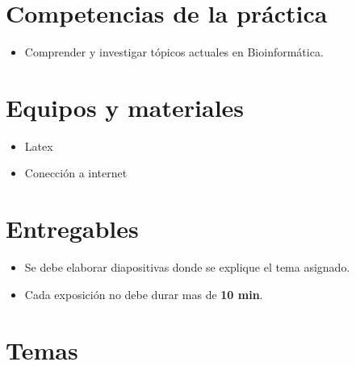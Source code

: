 \documentclass{article}
\begin{document}
	
	\section{Competencias de la práctica}
	\begin{itemize}
		\item Comprender y investigar tópicos actuales en Bioinformática.
	\end{itemize}
	
	\section{Equipos y materiales}
	\begin{itemize}
		\item Latex
		\item Conección a internet 
	\end{itemize}
	
	\section{Entregables}
	\begin{itemize}
		\item Se debe elaborar diapositivas donde se explique el tema asignado.
		\item Cada exposición no debe durar mas de \textbf{10 min}.
	\end{itemize}
	
	
	
	
	\clearpage
	
	
	\section{Temas}\label{sec:ejercicios}
	
\end{document}
